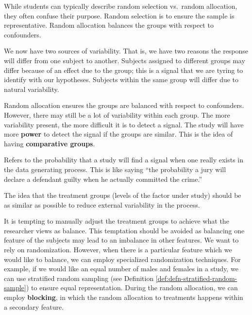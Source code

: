 \documentclass[]{book}
\theoremstyle{definition}
\theoremstyle{definition}
\theoremstyle{remark}
\let\BeginKnitrBlock\begin \let\EndKnitrBlock\end
\begin{document}
\BeginKnitrBlock{rmdtip}
While students can typically describe random selection vs.~random
allocation, they often confuse their purpose. Random selection is to
ensure the sample is representative. Random allocation balances the
groups with respect to confounders.
\EndKnitrBlock{rmdtip}

We now have two sources of variability. That is, we have two reasons the
response will differ from one subject to another. Subjects assigned to
different groups may differ because of an effect due to the group; this
is a signal that we are tyring to identify with our hypotheses. Subjects
within the same group will differ due to natural variability.

Random allocation ensures the groups are balanced with respect to
confounders. However, there may still be a lot of variability within
each group. The more variability present, the more difficult it is to
detect a signal. The study will have more \textbf{power} to detect the
signal if the groups are similar. This is the idea of having
\textbf{comparative groups}.

\BeginKnitrBlock{definition}[Power]
\protect\hypertarget{def:defn-power}{}{\label{def:defn-power}
{} }Refers to the probability that a study will find
a signal when one really exists in the data generating process. This is
like saying ``the probability a jury will declare a defendant guilty
when he actually committed the crime.''
\EndKnitrBlock{definition}

\BeginKnitrBlock{definition}[Comparative Groups]
\protect\hypertarget{def:defn-comparative-groups}{}{\label{def:defn-comparative-groups}
{} }The idea that the treatment groups
(levels of the factor under study) should be as similar as possible to
reduce external variability in the process.
\EndKnitrBlock{definition}

It is tempting to manually adjust the treatment groups to achieve what
the researcher views as balance. This temptation should be avoided as
balancing one feature of the subjects may lead to an imbalance in other
features. We want to rely on randomization. However, when there is a
particular feature which we would like to balance, we can employ
specialized randomization techniques. For example, if we would like an
equal number of males and females in a study, we can use stratified
random sampling (see Definition \ref{def:defn-stratified-random-sample})
to ensure equal representation. During the random allocation, we can
employ \textbf{blocking}, in which the random allocation to treatments
happens within a secondary feature.
\end{document}
